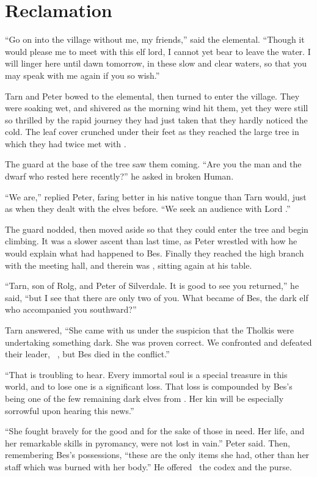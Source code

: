 \chapter{Reclamation}
``Go on into the village without me, my friends,'' said the elemental.  ``Though it would please me to meet with this elf lord, I cannot yet bear to leave the water.  I will linger here until dawn tomorrow, in these slow and clear waters, so that you may speak with me again if you so wish.''

Tarn and Peter bowed to the elemental, then turned to enter the village.   They were soaking wet, and shivered as the morning wind hit them, yet they were still so thrilled by the rapid journey they had just taken that they hardly noticed the cold.  The leaf cover crunched under their feet as they reached the large tree in which they had twice met with \arilor.

The guard at the base of the tree saw them coming.  ``Are you the man and the dwarf who rested here recently?'' he asked in broken Human.

``We are,'' replied Peter, faring better in his native tongue than Tarn would, just as when they dealt with the elves before.  ``We seek an audience with Lord \arilor.''

The guard nodded, then moved aside so that they could enter the tree and begin climbing.  It was a slower ascent than last time, as Peter wrestled with how he would explain what had happened to Bes.  Finally they reached the high branch with the meeting hall, and therein was \arilor, sitting again at his table.

``Tarn, son of Rolg, and Peter of Silverdale.  It is good to see you returned,'' he said, ``but I see that there are only two of you.  What became of Bes, the dark elf who accompanied you southward?''

Tarn answered, ``She came with us under the suspicion that the Tholkis were undertaking something dark.  She was proven correct.  We confronted and defeated their leader, \mothzam\ \driktur, but Bes died in the conflict.''

``That is troubling to hear.  Every immortal soul is a special treasure in this world, and to lose one is a significant loss.  That loss is compounded by Bes's being one of the few remaining dark elves from \yedmurdim.  Her kin will be especially sorrowful upon hearing this news.''

``She fought bravely for the good and for the sake of those in need.  Her life, and her remarkable skills in pyromancy, were not lost in vain.'' Peter said.  Then, remembering Bes's possessions, ``these are the only items she had, other than her staff which was burned with her body.''  He offered \arilor\ the codex and the purse.

